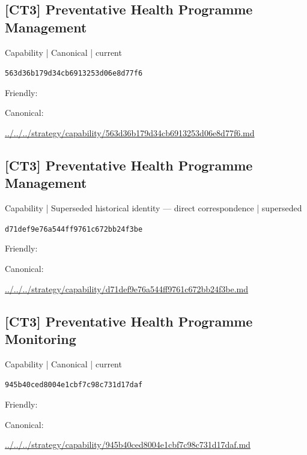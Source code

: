 \documentclass[10pt,a4paper]{article}
\begin{document}
\subsection*{[CT3] Preventative Health Programme Management}
{\small Capability | Canonical | current}\par
\texttt{563d36b179d34cb6913253d06e8d77f6}\par
Friendly: \par
Canonical: \par
{\footnotesize\url{../../../strategy/capability/563d36b179d34cb6913253d06e8d77f6.md}}\par
\subsection*{[CT3] Preventative Health Programme Management}
{\small Capability | Superseded historical identity — direct correspondence | superseded}\par
\texttt{d71def9e76a544ff9761c672bb24f3be}\par
Friendly: \par
Canonical: \par
{\footnotesize\url{../../../strategy/capability/d71def9e76a544ff9761c672bb24f3be.md}}\par
\subsection*{[CT3] Preventative Health Programme Monitoring}
{\small Capability | Canonical | current}\par
\texttt{945b40ced8004e1cbf7c98c731d17daf}\par
Friendly: \par
Canonical: \par
{\footnotesize\url{../../../strategy/capability/945b40ced8004e1cbf7c98c731d17daf.md}}\par
\end{document}
